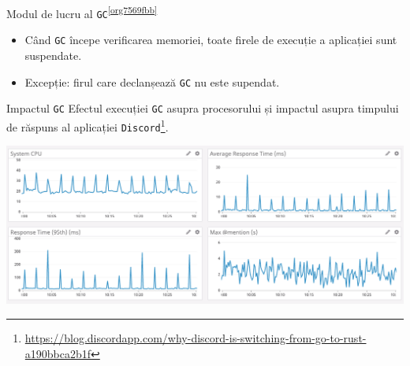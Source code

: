 \documentclass[presentation]{beamer}
\begin{document}
\begin{frame}[label={sec:org0758605},fragile]{Modul de lucru al \texttt{GC}\textsuperscript{\ref{org7569fbb}}}
 \begin{itemize}
\item Când \texttt{GC} începe verificarea memoriei, toate firele de execuție a aplicației sunt suspendate.
\item Excepție: firul care declanșează \texttt{GC} nu este supendat.
\end{itemize}
\end{frame}
\begin{frame}[label={sec:orgd568e81},fragile]{Impactul \texttt{GC}}
 Efectul execuției \texttt{GC} asupra procesorului și impactul asupra timpului de răspuns al aplicației \texttt{Discord}\footnote{\url{https://blog.discordapp.com/why-discord-is-switching-from-go-to-rust-a190bbca2b1f}}.
\begin{center}
\includegraphics[width=.9\linewidth]{img/gc-impact.png}
\end{center}
\end{frame}
\end{document}
